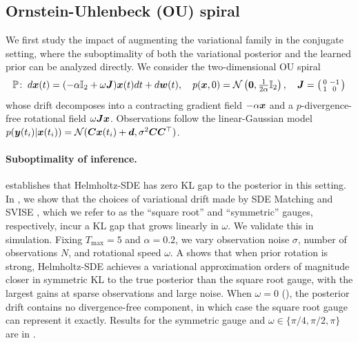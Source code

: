 \subsection{Ornstein-Uhlenbeck (OU) spiral}\label{subsec:ou}
We first study the impact of augmenting the variational family in the conjugate setting, where the suboptimality of both the variational posterior and the learned prior can be analyzed directly. We consider the two-dimensional OU spiral
\begin{equation}
\label{eqn:ou-spiral}
    \mathbb{P}\!: \; d \boldsymbol{x}(t) = (-\alpha \mathbb{I}_2 + \omega \boldsymbol{J})\boldsymbol{x}(t)dt + d\boldsymbol{w}(t), 
    \quad
    p(\boldsymbol{x},0) = \mathcal{N}\left(\boldsymbol{0}, \tfrac{1}{2\alpha}\mathbb{I}_2\right),
    \quad
    \boldsymbol{J} = \bigl(\begin{smallmatrix} 0 & -1 \\ 1 & 0 \end{smallmatrix}\bigr)
\end{equation}
whose drift decomposes into a contracting gradient field $-\alpha \boldsymbol{x}$ and a $p$-divergence-free rotational field $\omega \boldsymbol{J} \boldsymbol{x}$. Observations follow the linear-Gaussian model $p(\boldsymbol{y}(t_i) | \boldsymbol{x}(t_i)) = \mathcal{N}(\boldsymbol{C}\boldsymbol{x}(t_i)+\boldsymbol{d}, \sigma^2 \boldsymbol{C}\boldsymbol{C}^\top)$.

\paragraph{Suboptimality of inference.}
 establishes that Helmholtz-SDE has zero KL gap to the posterior in this setting. In , we show that the choices of variational drift made by SDE Matching \cite{bartosh2025sde} and SVISE \cite{course2023state,course2023amortized}, which we refer to as the ``square root'' and  ``symmetric'' gauges, respectively, incur a KL gap that grows linearly in $\omega$. We validate this in simulation. Fixing $T_{\max} = 5$ and $\alpha = 0.2$, we vary observation noise $\sigma$, number of observations $N$, and rotational speed $\omega$. 
A shows that when prior rotation is strong, Helmholtz-SDE achieves a variational approximation orders of magnitude closer in symmetric KL to the true posterior than the square root gauge, with the largest gains at sparse observations and large noise. 
When $\omega = 0$ (), the posterior drift contains no divergence-free component, in which case the square root gauge can represent it exactly. 
Results for the symmetric gauge and $\omega \in \{\pi/4, \pi/2, \pi\}$ are in .

